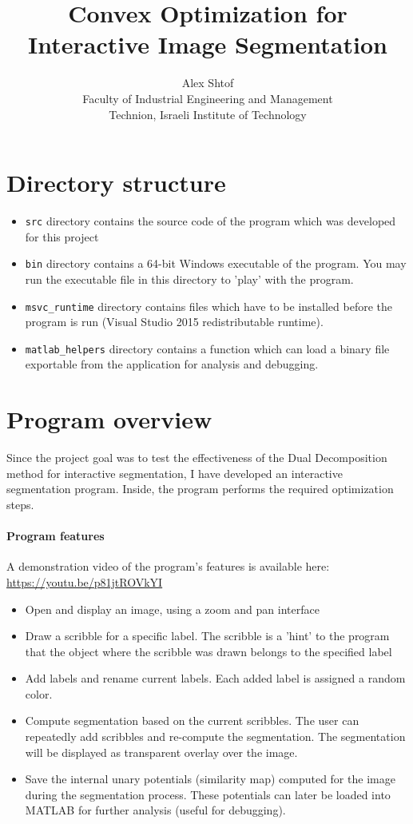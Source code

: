 \documentclass[12pt,a4paper]{article}
\title{Convex Optimization for Interactive Image Segmentation}
\author{Alex Shtof \\
        Faculty of Industrial Engineering and Management \\
        Technion, Israeli Institute of Technology}
\begin{document}
\maketitle

\section{Directory structure}
\begin{itemize}
	\item \texttt{src} directory contains the source code of the program which was developed for this project
	\item \texttt{bin} directory contains a 64-bit Windows executable of the program. You may run the executable file in this directory to 'play' with the program.
	\item \texttt{msvc\_runtime} directory contains files which have to be installed before the program is run (Visual Studio 2015 redistributable runtime). 
	\item \texttt{matlab\_helpers} directory contains a function which can load a binary file exportable from the application for analysis and debugging.
\end{itemize}


\section{Program overview}
Since the project goal was to test the effectiveness of the Dual Decomposition method for interactive segmentation, I have developed an interactive segmentation program. Inside, the program performs the required optimization steps. 

\paragraph{Program features}
A demonstration video of the program's features is available here: \href{https://youtu.be/p81jtROVkYI}{https://youtu.be/p81jtROVkYI}
\begin{itemize}
	\item Open and display an image, using a zoom and pan interface
	\item Draw a scribble for a specific label. The scribble is a 'hint' to the program that the object where the scribble was drawn belongs to the specified label
	\item Add labels and rename current labels. Each added label is assigned a random color.
	\item Compute segmentation based on the current scribbles. The user can repeatedly add scribbles and re-compute the segmentation. The segmentation will be displayed as transparent overlay over the image.
	\item Save the internal unary potentials (similarity map) computed for the image during the segmentation process. These potentials can later be loaded into MATLAB for further analysis (useful for debugging).
\end{itemize}
\end{document}
